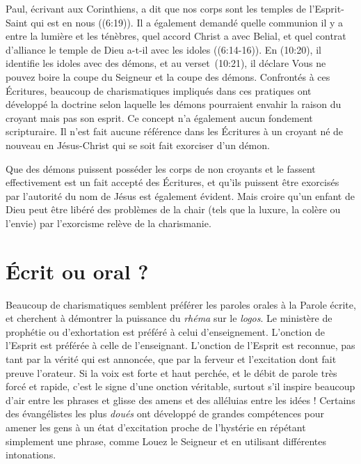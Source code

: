 Paul, écrivant aux Corinthiens, a dit que nos corps sont les temples
 de l'Esprit-Saint qui est en nous ((6:19)).
 Il a également demandé quelle communion il y a entre la lumière
 et les ténèbres, quel accord Christ a avec Belial,
 et quel contrat d'alliance le temple de Dieu a-t-il avec les idoles
 ((6:14-16)). En (10:20),
 il identifie les idoles avec des démons, et au verset~(10:21),
 il déclare\frcolon{} \Og Vous ne pouvez boire la coupe du Seigneur
 et la coupe des démons. \Fg{} Confrontés à ces Écritures,
 beaucoup de charismatiques impliqués dans ces pratiques
 ont développé la doctrine selon laquelle les démons pourraient envahir
 la raison du croyant mais pas son esprit.
 Ce concept n'a également aucun fondement scripturaire.
 Il n'est fait aucune référence dans les Écritures à un croyant né de nouveau
 en Jésus-Christ qui se soit fait exorciser d'un démon.

Que des démons puissent posséder les corps de non croyants
 et le fassent effectivement est un fait accepté des Écritures,
 et qu'ils puissent être exorcisés par l'autorité du nom de Jésus
 est également évident. Mais croire qu'un enfant de Dieu peut être libéré
 des problèmes de la chair (tels que la luxure, la colère ou l'envie)
 par l'exorcisme relève de la charismanie.


\section{\'Ecrit ou oral ?}

Beaucoup de charismatiques semblent préférer les paroles orales
 à la Parole écrite, et cherchent à démontrer la puissance
 du \emph{rhéma} sur le \emph{logos}.
 Le ministère de prophétie ou d'exhortation
 est préféré à celui d'enseignement. L'onction de l'Esprit est préférée
 à celle de l'enseignant. L'onction de l'Esprit est reconnue,
 pas tant par la vérité qui est annoncée, que par la ferveur
 et l'excitation dont fait preuve l'orateur. Si la voix est forte
 et haut perchée, et le débit de parole très forcé et rapide,
 c'est le signe d'une onction véritable, surtout s'il inspire beaucoup
 d'air entre les phrases et glisse des amens et des alléluias
 entre les idées ! Certains des évangélistes les plus \emph{doués}
 ont développé de grandes compétences pour amener les gens
 à un état d'excitation proche de l'hystérie en répétant simplement
 une phrase, comme\frcolon{} \Og Louez le Seigneur \Fg{} et en utilisant différentes
 intonations.

